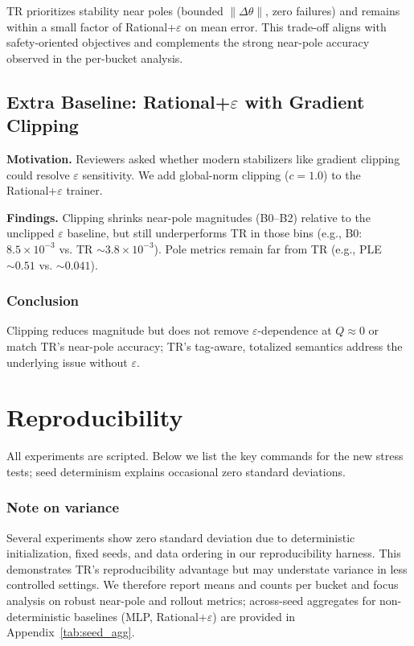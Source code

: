 \documentclass[11pt,twoside]{article}
\begin{document}
TR prioritizes stability near poles (bounded $\|\Delta\theta\|$, zero failures) and remains within a small factor of Rational+$\varepsilon$ on mean error. This trade-off aligns with safety-oriented objectives and complements the strong near-pole accuracy observed in the per-bucket analysis.

\subsection{Extra Baseline: Rational+$\varepsilon$ with Gradient Clipping}
\textbf{Motivation.} Reviewers asked whether modern stabilizers like gradient clipping could resolve $\varepsilon$ sensitivity. We add global-norm clipping ($c=1.0$) to the Rational+$\varepsilon$ trainer.

\textbf{Findings.} Clipping shrinks near-pole magnitudes (B0--B2) relative to the unclipped $\varepsilon$ baseline, but still underperforms TR in those bins (e.g., B0: $8.5\times10^{-3}$ vs. TR $\sim 3.8\times10^{-3}$). Pole metrics remain far from TR (e.g., PLE $\sim 0.51$ vs. $\sim 0.041$).

\subsubsection{Conclusion}

Clipping reduces magnitude but does not remove $\varepsilon$-dependence at $Q\approx 0$ or match TR's near-pole accuracy; TR's tag-aware, totalized semantics address the underlying issue without $\varepsilon$.

\section{Reproducibility}
All experiments are scripted. Below we list the key commands for the new stress tests; seed determinism explains occasional zero standard deviations.
\subsubsection{Note on variance}

Several experiments show zero standard deviation due to deterministic initialization, fixed seeds, and data ordering in our reproducibility harness. This demonstrates TR's reproducibility advantage but may understate variance in less controlled settings. We therefore report means and counts per bucket and focus analysis on robust near-pole and rollout metrics; across-seed aggregates for non-deterministic baselines (MLP, Rational+$\varepsilon$) are provided in Appendix~\ref{tab:seed_agg}.
\end{document}
